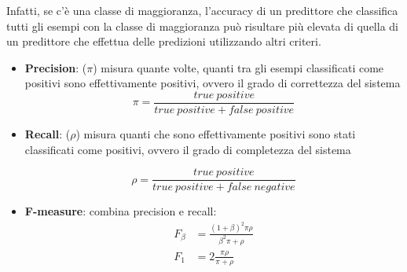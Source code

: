 Infatti, se c'è una classe di maggioranza, l'accuracy di un predittore che classifica tutti gli esempi
con la classe di maggioranza può risultare più elevata di quella di un predittore che effettua delle predizioni
utilizzando altri criteri.

\begin{itemize}
\item
  \textbf{Precision}: ($\pi$) misura quante volte, quanti tra gli esempi
  classificati come positivi sono effettivamente positivi, ovvero il grado di correttezza del sistema
  $$ \pi = \frac{true \: positive}{true \: positive + false \: positive}$$  

\item   \textbf{Recall}: ($\rho$) misura quanti che sono effettivamente positivi
  sono stati classificati come positivi, ovvero il grado di completezza del sistema
  
  $$ \rho = \frac{true \: positive}{true \: positive + false \: negative}$$  
 \item  \textbf{F-measure}: combina precision e recall:
  \begin{align*}
	F_{\beta} &= \frac{(1+\beta)^2\pi\rho}{\beta^2\pi + \rho} \\
	F_1 &= 2\frac{\pi\rho}{\pi + \rho}
  \end{align*} 
\end{itemize}
 